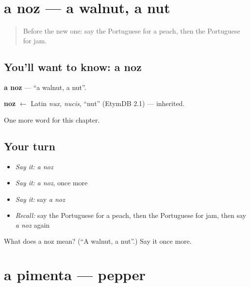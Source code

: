 \section[a noz]{a noz — a walnut, a nut}

\label{lesson:PT-C109-noz}



\begin{quote}
Before the new one: say the Portuguese for a peach, then the Portuguese for jam.
\end{quote}

\subsection*{You'll want to know: a noz}
\textbf{a noz} — \textquotedblleft{}a walnut, a nut\textquotedblright{}.

\begin{cousinweb}
\textbf{noz} $\leftarrow$ Latin \emph{nux, nucis}, \textquotedblleft{}nut\textquotedblright{} (EtymDB 2.1) — inherited.
\end{cousinweb}

\begin{grammarlens}[title={What you've built}]
One more word for this chapter.
\end{grammarlens}

\subsection*{Your turn}
\begin{itemize}
\raggedright
  \item \emph{Say it:} \emph{a noz}
  \item \emph{Say it:} \emph{a noz}, once more
  \item \emph{Say it:} say \emph{a noz}
  \item \emph{Recall:} say the Portuguese for a peach, then the Portuguese for jam, then say \emph{a noz} again
\end{itemize}

\begin{tcolorbox}[breakable,colback=teal!4,colframe=teal!35!black,title={Before you move on}]
What does a noz mean? (\textquotedblleft{}A walnut, a nut\textquotedblright{}.) Say it once more.
\end{tcolorbox}
\section[a pimenta]{a pimenta — pepper}

